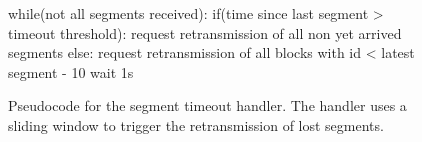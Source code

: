 \begin{figure}[tb]
	\begin{center}
		\begin{PseudoCode}
while(not all segments received):
	if(time since last segment > timeout threshold):
		request retransmission of all non yet arrived segments
	else:
		request retransmission of all blocks with id < latest segment - 10
	wait 1s
\end{PseudoCode}
\caption[Pseudocode for the segment timeout handler]{\label{pseudocode:timeoutHandler}Pseudocode for the segment timeout handler. The handler uses a sliding window to trigger the retransmission of lost segments.}
	\end{center}
\end{figure}






